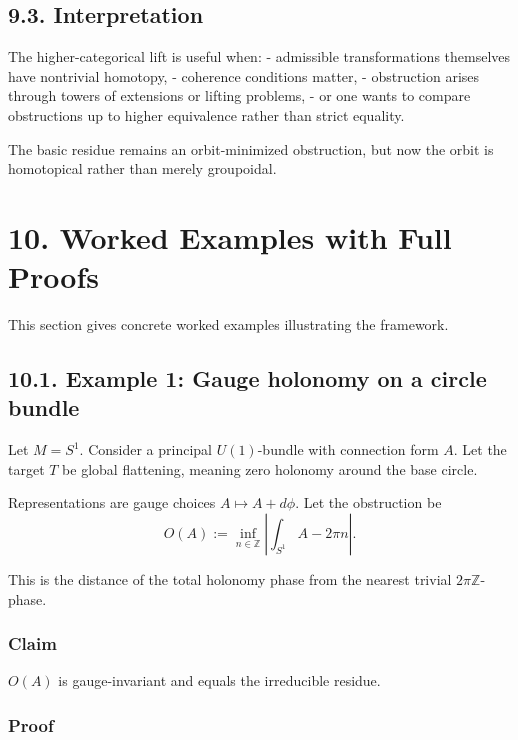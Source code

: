 \documentclass[
]{article}
\begin{document}
\subsection{9.3. Interpretation}\label{interpretation-2}

The higher-categorical lift is useful when: - admissible transformations
themselves have nontrivial homotopy, - coherence conditions matter, -
obstruction arises through towers of extensions or lifting problems, -
or one wants to compare obstructions up to higher equivalence rather
than strict equality.

The basic residue remains an orbit-minimized obstruction, but now the
orbit is homotopical rather than merely groupoidal.

\section{10. Worked Examples with Full
Proofs}\label{worked-examples-with-full-proofs}

This section gives concrete worked examples illustrating the framework.

\subsection{10.1. Example 1: Gauge holonomy on a circle
bundle}\label{example-1-gauge-holonomy-on-a-circle-bundle}

Let \(M = S^1\). Consider a principal \(U(1)\)-bundle with connection
form \(A\). Let the target \(T\) be global flattening, meaning zero
holonomy around the base circle.

Representations are gauge choices \(A \mapsto A + d\phi\). Let the
obstruction be \[
O(A) := \inf_{n \in \mathbb{Z}} \left| \int_{S^1} A - 2\pi n \right|.
\]

This is the distance of the total holonomy phase from the nearest
trivial \(2\pi \mathbb{Z}\)-phase.

\subsubsection{Claim}\label{claim}

\(O(A)\) is gauge-invariant and equals the irreducible residue.

\subsubsection{Proof}\label{proof-7}
\end{document}
